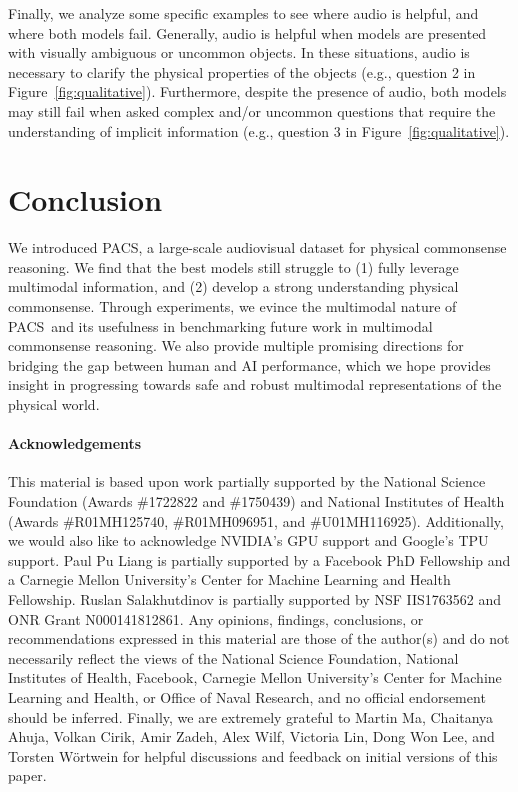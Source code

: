 \documentclass[runningheads]{llncs}
\newcommand{\names}{\textsc{PACS}}
\begin{document}
Finally, we analyze some specific examples to see where audio is helpful, and where both models fail. Generally, audio is helpful when models are presented with visually ambiguous or uncommon objects. In these situations, audio is necessary to clarify the physical properties of the objects (e.g., question 2 in Figure~\ref{fig:qualitative}). Furthermore, despite the presence of audio, both models may still fail when asked complex and/or uncommon questions that require the understanding of implicit information (e.g., question 3 in Figure~\ref{fig:qualitative}).

\section{Conclusion}


We introduced \names, a large-scale audiovisual dataset for physical commonsense reasoning. We find that the best models still struggle to (1) fully leverage multimodal information, and (2) develop a strong understanding physical commonsense. 
Through experiments, we evince the multimodal nature of \names\ and its usefulness in benchmarking future work in multimodal commonsense reasoning. We also provide multiple promising directions for bridging the gap between human and AI performance, which we hope provides insight in progressing towards safe and robust multimodal representations of the physical world.




\paragraph{\textbf{Acknowledgements}} This material is based upon work partially supported by the National Science Foundation (Awards \#1722822 and \#1750439) and National Institutes of Health (Awards \#R01MH125740, \#R01MH096951, and \#U01MH116925). Additionally, we would also like to acknowledge NVIDIA's GPU support and Google's TPU support.
Paul Pu Liang is partially supported by a Facebook PhD Fellowship and a Carnegie Mellon University's Center for Machine Learning and Health Fellowship. Ruslan Salakhutdinov is partially supported by NSF IIS1763562 and ONR Grant N000141812861.
Any opinions, findings, conclusions, or recommendations expressed in this material are those of the author(s) and do not necessarily reflect the views of the National Science Foundation, National Institutes of Health, Facebook, Carnegie Mellon University's Center for Machine Learning and Health, or Office of Naval Research, and no official endorsement should be inferred. 
Finally, we are extremely grateful to Martin Ma, Chaitanya Ahuja, Volkan Cirik, Amir Zadeh, Alex Wilf, Victoria Lin, Dong Won Lee, and Torsten W\"{o}rtwein for helpful discussions and feedback on initial versions of this paper.
\end{document}
